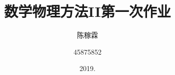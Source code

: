 \documentclass[10pt,a4paper]{article}
\title{数学物理方法II第一次作业}
\author{陈稼霖 \and 45875852}
\date{2019.}
\begin{document}
\maketitle
\section{}
\end{document}
